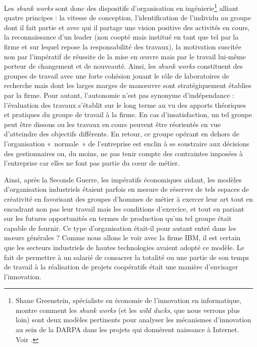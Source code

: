 \documentclass{FramateX}
\begin{document}
\begin{refsection}
Les \textit{shunk works} sont donc des dispositifs d'organisation en
ingénierie\footnote{Shane Greenstein, spécialiste en économie de
l'innovation en informatique, montre comment les \textit{shunk works} (et les \textit{wild ducks}, que nous
verrons plus loin) sont deux modèles pertinents pour analyser les
mécanismes d'innovation au sein de la DARPA dans les projets qui
donnèrent naissance à Internet. Voir \cite{greensteinnurturing2011}.} alliant quatre
principes : la vitesse de conception, l'identification
de l'individu au groupe dont il fait partie et avec
qui il partage une vision positive des activités en cours, la
reconnaissance d'un leader (non coopté mais institué
en tant que tel par la firme et sur lequel repose la responsabilité des
travaux), la motivation suscitée non par l'impératif
de réussite de la mise en œuvre mais par le travail lui-même porteur
de changement et de nouveauté. Ainsi, les \textit{shunk works}
constituent des groupes de travail avec une forte cohésion jouant le
rôle de laboratoires de recherche mais dont les larges marges de
manœuvre sont stratégiquement établies par la firme. Pour autant,
l'autonomie n'est pas synonyme
d'indépendance : l'évaluation des
travaux s'établit sur le long terme au vu des apports théoriques et
pratiques du groupe de travail à la firme. En cas
d'insatisfaction, un tel groupe peut être dissous ou
les travaux en cours peuvent être réorientés en vue
d'atteindre des objectifs différents. En retour, ce
groupe opérant en dehors de l'organisation «~normale~»
de l'entreprise est enclin à se soustraire aux
décisions des gestionnaires ou, du moins, ne pas tenir compte des
contraintes imposées à l'entreprise car elles ne font
pas partie du cœur de métier.

Ainsi, après la Seconde Guerre, les impératifs économiques aidant, les
modèles d'organisation industriels étaient parfois en
mesure de réserver de tels espaces de créativité en favorisant des
groupes d'hommes de métier à exercer leur art tout en
encadrant non pas leur travail mais les conditions
d'exercice, et tout en pariant sur les futures
opportunités en termes de production qu'un tel groupe
était capable de fournir. Ce type d'organisation
était-il pour autant entré dans les mœurs générales ? Comme nous allons
le voir avec la firme IBM, il est certain que les secteurs industriels
de hautes technologies avaient adopté ce modèle. Le fait de permettre à
un salarié de consacrer la totalité ou une partie de son temps de
travail à la réalisation de projets coopératifs était une manière
d'envisager l'innovation.


\end{refsection}
\end{document}
